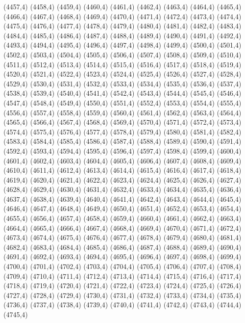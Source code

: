 (4457,4)
(4458,4)
(4459,4)
(4460,4)
(4461,4)
(4462,4)
(4463,4)
(4464,4)
(4465,4)
(4466,4)
(4467,4)
(4468,4)
(4469,4)
(4470,4)
(4471,4)
(4472,4)
(4473,4)
(4474,4)
(4475,4)
(4476,4)
(4477,4)
(4478,4)
(4479,4)
(4480,4)
(4481,4)
(4482,4)
(4483,4)
(4484,4)
(4485,4)
(4486,4)
(4487,4)
(4488,4)
(4489,4)
(4490,4)
(4491,4)
(4492,4)
(4493,4)
(4494,4)
(4495,4)
(4496,4)
(4497,4)
(4498,4)
(4499,4)
(4500,4)
(4501,4)
(4502,4)
(4503,4)
(4504,4)
(4505,4)
(4506,4)
(4507,4)
(4508,4)
(4509,4)
(4510,4)
(4511,4)
(4512,4)
(4513,4)
(4514,4)
(4515,4)
(4516,4)
(4517,4)
(4518,4)
(4519,4)
(4520,4)
(4521,4)
(4522,4)
(4523,4)
(4524,4)
(4525,4)
(4526,4)
(4527,4)
(4528,4)
(4529,4)
(4530,4)
(4531,4)
(4532,4)
(4533,4)
(4534,4)
(4535,4)
(4536,4)
(4537,4)
(4538,4)
(4539,4)
(4540,4)
(4541,4)
(4542,4)
(4543,4)
(4544,4)
(4545,4)
(4546,4)
(4547,4)
(4548,4)
(4549,4)
(4550,4)
(4551,4)
(4552,4)
(4553,4)
(4554,4)
(4555,4)
(4556,4)
(4557,4)
(4558,4)
(4559,4)
(4560,4)
(4561,4)
(4562,4)
(4563,4)
(4564,4)
(4565,4)
(4566,4)
(4567,4)
(4568,4)
(4569,4)
(4570,4)
(4571,4)
(4572,4)
(4573,4)
(4574,4)
(4575,4)
(4576,4)
(4577,4)
(4578,4)
(4579,4)
(4580,4)
(4581,4)
(4582,4)
(4583,4)
(4584,4)
(4585,4)
(4586,4)
(4587,4)
(4588,4)
(4589,4)
(4590,4)
(4591,4)
(4592,4)
(4593,4)
(4594,4)
(4595,4)
(4596,4)
(4597,4)
(4598,4)
(4599,4)
(4600,4)
(4601,4)
(4602,4)
(4603,4)
(4604,4)
(4605,4)
(4606,4)
(4607,4)
(4608,4)
(4609,4)
(4610,4)
(4611,4)
(4612,4)
(4613,4)
(4614,4)
(4615,4)
(4616,4)
(4617,4)
(4618,4)
(4619,4)
(4620,4)
(4621,4)
(4622,4)
(4623,4)
(4624,4)
(4625,4)
(4626,4)
(4627,4)
(4628,4)
(4629,4)
(4630,4)
(4631,4)
(4632,4)
(4633,4)
(4634,4)
(4635,4)
(4636,4)
(4637,4)
(4638,4)
(4639,4)
(4640,4)
(4641,4)
(4642,4)
(4643,4)
(4644,4)
(4645,4)
(4646,4)
(4647,4)
(4648,4)
(4649,4)
(4650,4)
(4651,4)
(4652,4)
(4653,4)
(4654,4)
(4655,4)
(4656,4)
(4657,4)
(4658,4)
(4659,4)
(4660,4)
(4661,4)
(4662,4)
(4663,4)
(4664,4)
(4665,4)
(4666,4)
(4667,4)
(4668,4)
(4669,4)
(4670,4)
(4671,4)
(4672,4)
(4673,4)
(4674,4)
(4675,4)
(4676,4)
(4677,4)
(4678,4)
(4679,4)
(4680,4)
(4681,4)
(4682,4)
(4683,4)
(4684,4)
(4685,4)
(4686,4)
(4687,4)
(4688,4)
(4689,4)
(4690,4)
(4691,4)
(4692,4)
(4693,4)
(4694,4)
(4695,4)
(4696,4)
(4697,4)
(4698,4)
(4699,4)
(4700,4)
(4701,4)
(4702,4)
(4703,4)
(4704,4)
(4705,4)
(4706,4)
(4707,4)
(4708,4)
(4709,4)
(4710,4)
(4711,4)
(4712,4)
(4713,4)
(4714,4)
(4715,4)
(4716,4)
(4717,4)
(4718,4)
(4719,4)
(4720,4)
(4721,4)
(4722,4)
(4723,4)
(4724,4)
(4725,4)
(4726,4)
(4727,4)
(4728,4)
(4729,4)
(4730,4)
(4731,4)
(4732,4)
(4733,4)
(4734,4)
(4735,4)
(4736,4)
(4737,4)
(4738,4)
(4739,4)
(4740,4)
(4741,4)
(4742,4)
(4743,4)
(4744,4)
(4745,4)
